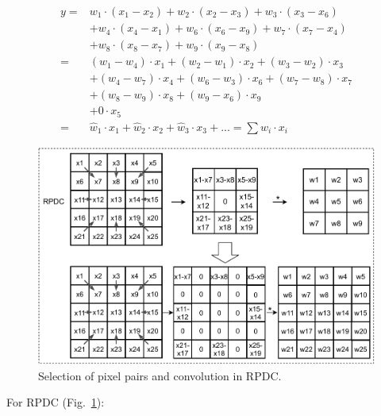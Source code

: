 \documentclass[10pt,twocolumn,letterpaper]{article}
\begin{document}
{\small
\begin{align}
    y =& w_{1}\cdot (x_1 - x_2) + w_2\cdot (x_2 - x_3)+w_3\cdot (x_3 - x_6)\nonumber\\
    & + w_4\cdot (x_4-x_1) + w_6\cdot (x_6 - x_9) + w_7\cdot (x_7 - x_4)\nonumber \\
    & + w_8\cdot (x_8 - x_7) + w_9\cdot (x_9 - x_8)\nonumber \\
    =& (w_1 - w_4)\cdot x_1 + (w_2 - w_1)\cdot x_2 + (w_3-w_2)\cdot x_3 \nonumber \\
    & + (w_4 - w_7)\cdot x_4 + (w_6 - w_3)\cdot x_6 + (w_7 - w_8)\cdot x_7 \nonumber \\
    & + (w_8 - w_9)\cdot x_8 + (w_9 - x_6)\cdot x_9\nonumber \\
    & + 0\cdot x_5\nonumber \\
    =& \hat{w}_1\cdot x_1 + \hat{w}_2\cdot x_2 + \hat{w}_3\cdot x_3 + ... =\sum \hat{w}_i\cdot x_i
\end{align}
}

\begin{figure}[t!]
    \centering
    \includegraphics[width=0.95\linewidth]{images/supplement_rpdc.pdf}
    \caption{Selection of pixel pairs and convolution in RPDC.}
    \label{fig:rpdc}
\end{figure}

\vspace{0.3em}
\noindent For RPDC (Fig.~\ref{fig:rpdc}):
\end{document}

